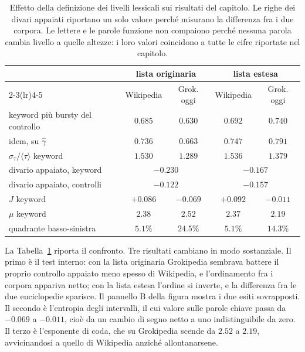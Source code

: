 \begin{table}[htbp]
  \centering
  \begin{tabular}{lcccc}
    \toprule
    & \multicolumn{2}{c}{lista originaria} & \multicolumn{2}{c}{lista estesa} \\
    \cmidrule(lr){2-3}\cmidrule(lr){4-5}
    & Wikipedia & Grok. oggi & Wikipedia & Grok. oggi \\
    \midrule
    keyword più bursty del controllo & $0.685$ & $0.630$ & $0.692$ & $0.740$ \\
    idem, su $\hat\gamma$ & $0.736$ & $0.663$ & $0.747$ & $0.791$ \\
    $\sigma_\tau/\langle\tau\rangle$ keyword & $1.530$ & $1.289$ & $1.536$ & $1.379$ \\
    divario appaiato, keyword & \multicolumn{2}{c}{$-0.230$} & \multicolumn{2}{c}{$-0.167$} \\
    divario appaiato, controlli & \multicolumn{2}{c}{$-0.122$} & \multicolumn{2}{c}{$-0.157$} \\
    $J$ keyword & $+0.086$ & $-0.069$ & $+0.092$ & $-0.011$ \\
    $\mu$ keyword & $2.38$ & $2.52$ & $2.37$ & $2.19$ \\
    quadrante basso-sinistra & $5.1\%$ & $24.5\%$ & $5.1\%$ & $14.3\%$ \\
    \bottomrule
  \end{tabular}
  \caption{Effetto della definizione dei livelli lessicali sui risultati del
  capitolo. Le righe dei divari appaiati riportano un solo valore perché
  misurano la differenza fra i due corpora. Le lettere e le parole funzione non
  compaiono perché nessuna parola cambia livello a quelle altezze: i loro valori
  coincidono a tutte le cifre riportate nel capitolo.}
  \label{tab:effetto-stoplist}
\end{table}

La Tabella~\ref{tab:effetto-stoplist} riporta il confronto. Tre risultati
cambiano in modo sostanziale. Il primo è il test interno: con la lista
originaria Grokipedia sembrava battere il proprio controllo appaiato meno spesso
di Wikipedia, e l'ordinamento fra i corpora appariva netto; con la lista estesa
l'ordine si inverte, e la differenza fra le due enciclopedie sparisce. Il
pannello B della figura mostra i due esiti sovrapposti. Il secondo è l'entropia
degli intervalli, il cui valore sulle parole chiave passa da $-0.069$ a
$-0.011$, cioè da un cambio di segno netto a uno indistinguibile da zero. Il
terzo è l'esponente di coda, che su Grokipedia scende da $2.52$ a $2.19$,
avvicinandosi a quello di Wikipedia anziché allontanarsene.

